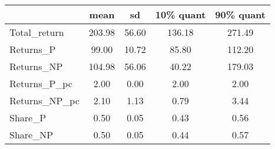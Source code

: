 \begin{tabular}{lcccc}
\toprule
{} &    mean &     sd &  10\% quant &  90\% quant \\
\midrule
Total\_return  &  203.98 &  56.60 &     136.18 &     271.49 \\
Returns\_P     &   99.00 &  10.72 &      85.80 &     112.20 \\
Returns\_NP    &  104.98 &  56.06 &      40.22 &     179.03 \\
Returns\_P\_pc  &    2.00 &   0.00 &       2.00 &       2.00 \\
Returns\_NP\_pc &    2.10 &   1.13 &       0.79 &       3.44 \\
Share\_P       &    0.50 &   0.05 &       0.43 &       0.56 \\
Share\_NP      &    0.50 &   0.05 &       0.44 &       0.57 \\
\bottomrule
\end{tabular}
